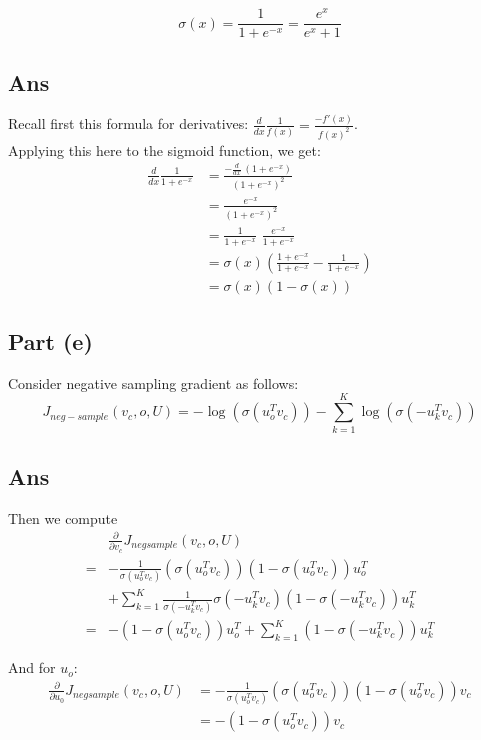 \documentclass{article}
\begin{document}
\begin{equation*}
\sigma (x) =  \frac{1}{1 + e^{-x}} =  \frac{e^x}{e^x + 1}
\end{equation*}

\subsection*{Ans}
Recall first this formula for derivatives: 
$ \frac{d}{dx} \frac{1}{f(x)} = \frac{-f'(x)}{f(x)^2}$. \\
Applying this here to the sigmoid function, we get:
\begin{align*}
\frac{d}{dx} \frac{1}{1+e^{-x}} &= \frac{ - \frac{d}{dx} \, (1 + e^{-x})}{(1 + e^{-x})^2} \\
&= \frac{e^{-x}}{(1 + e^{-x})^2} \\
&= \frac{1}{1 + e^{-x}} \, \, \frac{e^{-x}}{1 + e^{-x}} \\
&= \sigma(x) \left( \frac{1 + e^{-x}}{1 + e^{-x}} - \frac{1}{1 + e^{-x}} \right) \\
&= \sigma(x) ( 1 - \sigma(x))
\end{align*}

\subsection*{Part (e)}
Consider negative sampling gradient as follows:
\begin{equation}J_{neg-sample}(v_c, o, U) = - \log (\sigma (u_o^T v_c)) - \sum_{k=1}^K \log (\sigma (-u_k^T v_c))\end{equation}

\subsection*{Ans}
Then we compute 
\begin{align*}
&\frac{\partial}{\partial v_c} J_{negsample}(v_c, o, U) \\ 
= &-\frac{1}{\sigma (u_o^T v_c)}(\sigma (u_o^T v_c))(1 - \sigma (u_o^T v_c)) u_o^T \\
& + \sum_{k=1}^K  \frac{1}{\sigma(-u_k^T v_c )} \sigma(-u_k^T v_c ) (1 - \sigma(-u_k^T v_c )) u_k^T \\
= & -(1 - \sigma (u_o^T v_c)) u_o^T + \sum_{k=1}^K  (1 - \sigma(-u_k^T v_c )) u_k^T
\end{align*}

And for $u_o$:
\begin{align*}
\frac{\partial}{\partial u_0} J_{negsample}(v_c, o, U) 
&= -\frac{1}{\sigma (u_o^T v_c)}(\sigma (u_o^T v_c))(1 - \sigma (u_o^T v_c)) v_c \\
&= - (1 - \sigma (u_o^T v_c)) v_c
\end{align*}
\end{document}
